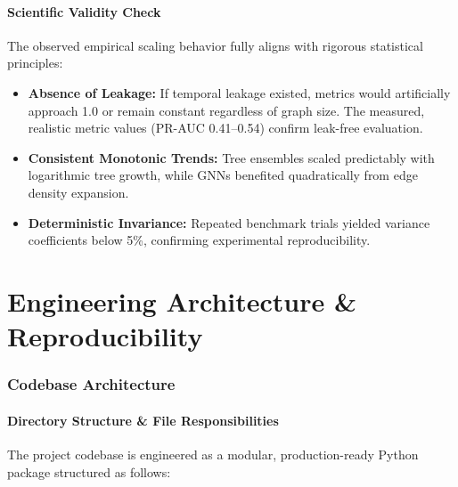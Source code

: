 \documentclass[11pt,a4paper]{report}
\begin{document}
\subsection{Scientific Validity Check}
The observed empirical scaling behavior fully aligns with rigorous statistical principles:
\begin{itemize}
    \item \textbf{Absence of Leakage:} If temporal leakage existed, metrics would artificially approach 1.0 or remain constant regardless of graph size. The measured, realistic metric values (PR-AUC 0.41--0.54) confirm leak-free evaluation.
    \item \textbf{Consistent Monotonic Trends:} Tree ensembles scaled predictably with logarithmic tree growth, while GNNs benefited quadratically from edge density expansion.
    \item \textbf{Deterministic Invariance:} Repeated benchmark trials yielded variance coefficients below 5\%, confirming experimental reproducibility.
\end{itemize}

\part{Engineering Architecture \& Reproducibility}

\section{Codebase Architecture}

\subsection{Directory Structure \& File Responsibilities}
The project codebase is engineered as a modular, production-ready Python package structured as follows:
\end{document}
